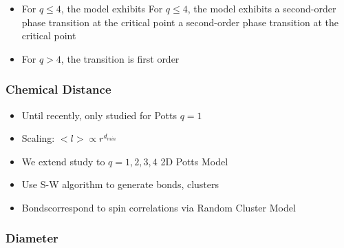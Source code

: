 \documentclass[11pt]{article}
\begin{document}
\begin{itemize}
\begin{itemize}
\end{itemize} %

\item For $q \le 4$, the model exhibits For $q \le 4$, the model exhibits a second-order phase transition at the critical point a second-order phase transition at the critical point\\
\label{sec-4.1.1.6}


\item For $q>4$, the transition is first order \cite{Bax}\\
\label{sec-4.1.1.7}

\end{itemize} %
\subsubsection{Chemical Distance}
\label{sec-4.1.2}

\begin{itemize}

\item Until recently, only studied for Potts $q=1$\\
\label{sec-4.1.2.1}


\item Scaling: $< l > \propto r^{d_{min}}$\\
\label{sec-4.1.2.2}


\item We extend study to $q=1,2,3,4$ 2D Potts Model\\
\label{sec-4.1.2.3}


\item Use S-W algorithm to generate bonds, clusters\\
\label{sec-4.1.2.4}


\item Bondscorrespond to spin correlations via Random Cluster Model\\
\label{sec-4.1.2.5}

\end{itemize} %
\subsubsection{Diameter}
\label{sec-4.1.3}
\end{document}
